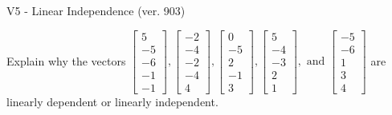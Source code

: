 \begin{exercise}
  \begin{exerciseTitle}V5 - Linear Independence (ver. 903)\end{exerciseTitle}
  \begin{exerciseStatement}
    Explain why the vectors \(\left[\begin{array}{r}
5 \\
-5 \\
-6 \\
-1 \\
-1
\end{array}\right] , \left[\begin{array}{r}
-2 \\
-4 \\
-2 \\
-4 \\
4
\end{array}\right] , \left[\begin{array}{r}
0 \\
-5 \\
2 \\
-1 \\
3
\end{array}\right] , \left[\begin{array}{r}
5 \\
-4 \\
-3 \\
2 \\
1
\end{array}\right] , \text{ and } \left[\begin{array}{r}
-5 \\
-6 \\
1 \\
3 \\
4
\end{array}\right]\) are linearly dependent or linearly independent.	



\end{exerciseStatement}
\end{exercise}
